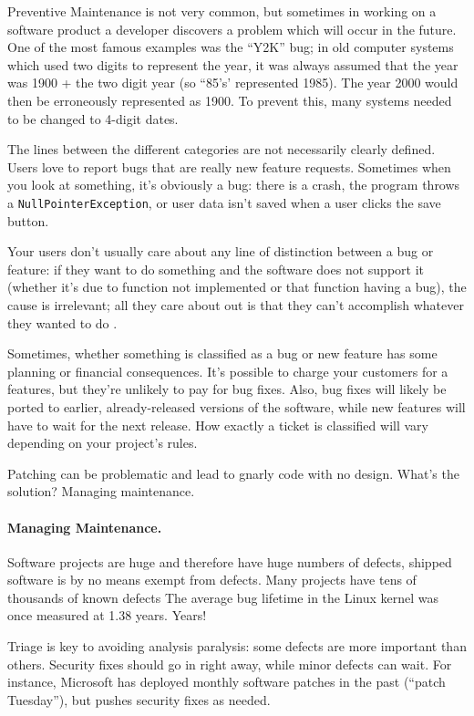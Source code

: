 Preventive Maintenance is not very common, but sometimes in working on a software product a developer discovers a problem which will occur in the future. One of the most famous examples was the ``Y2K'' bug; in old computer systems which used two digits to represent the year, it was always assumed that the year was 1900 + the two digit year (so ``85's' represented 1985). The year 2000 would then be erroneously represented as 1900. To prevent this, many systems needed to be changed to 4-digit dates.


The lines between the different categories are not necessarily clearly defined. Users love to report bugs that are really new feature requests. Sometimes when you look at something, it's obviously a bug: there is a crash, the program throws a \texttt{NullPointerException}, or user data isn't saved when a user clicks the save button. 

Your users don't usually care about any line of distinction between a bug or feature: if they want to do something and the software does not support it (whether it's due to function not implemented or that function having a bug), the cause is irrelevant; all they care about out is that they can't accomplish whatever they wanted to do \cite{atwood:bfr}.

Sometimes, whether something is classified as a bug or new feature has some planning or financial consequences. It's possible to charge your customers for a features, but they're unlikely to pay for bug fixes. Also, bug fixes will likely be ported to earlier, already-released versions of the software, while new features will have to wait for the next release. How exactly a ticket is classified will vary depending on your project's rules.

Patching can be problematic and lead to gnarly code with no
design. What's the solution? Managing maintenance.

\paragraph{Managing Maintenance.}
Software projects are huge and therefore have huge numbers of defects,
shipped software is by no means exempt from defects. Many projects
have tens of thousands of known defects The average bug lifetime in the Linux kernel was once measured at 1.38 years. Years!

Triage is key to avoiding analysis paralysis: some defects are more
important than others. Security fixes should go in right away, while
minor defects can wait. For instance, Microsoft has deployed monthly
software patches in the past (``patch Tuesday''), but pushes security fixes as needed.

